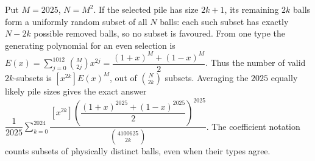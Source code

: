 Put $M=2025$, $N=M^2$. If the selected pile has size $2k+1$, its remaining $2k$ balls form a uniformly random subset of all $N$ balls: each such subset has exactly $N-2k$ possible removed balls, so no subset is favoured. From one type the generating polynomial for an even selection is $E(x)=\sum_{j=0}^{1012}\binom M{2j}x^{2j}=\dfrac{(1+x)^M+(1-x)^M}{2}$. Thus the number of valid $2k$-subsets is $[x^{2k}]E(x)^M$, out of $\binom N{2k}$ subsets. Averaging the $2025$ equally likely pile sizes gives the exact answer $\boxed{\dfrac{1}{2025}\sum_{k=0}^{2024}\dfrac{[x^{2k}]\left(\dfrac{(1+x)^{2025}+(1-x)^{2025}}{2}\right)^{2025}}{\binom{4100625}{2k}}}$. The coefficient notation counts subsets of physically distinct balls, even when their types agree.

